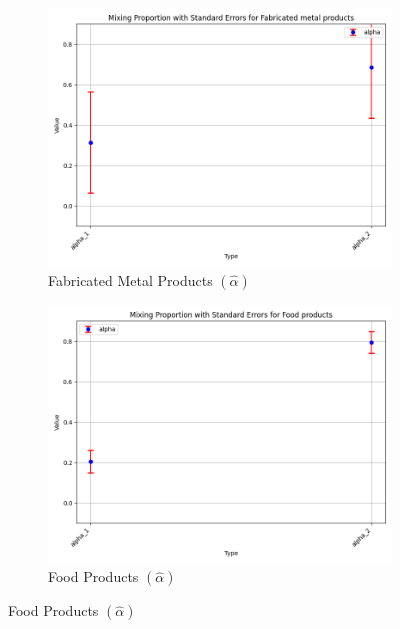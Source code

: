\documentclass{article}
\begin{document}
\begin{figure}[ht!]
    \centering 
    \caption{AR(1) 2-Component Mixture Model}
    \begin{subfigure}[t]{0.32\textwidth}
        \centering
        \includegraphics[width=\textwidth]{figure/empirical_ar1_mixture_alpha_with_error_bars_Fabricated metal products.png}
        \caption{Fabricated Metal Products $(\hat\alpha)$}
    \end{subfigure}
    \begin{subfigure}[t]{0.32\textwidth}
        \centering
        \includegraphics[width=\textwidth]{figure/empirical_ar1_mixture_alpha_with_error_bars_Food products.png}
        \caption{Food Products  $(\hat\alpha)$}

\end{subfigure}
\end{figure}
\end{document}
